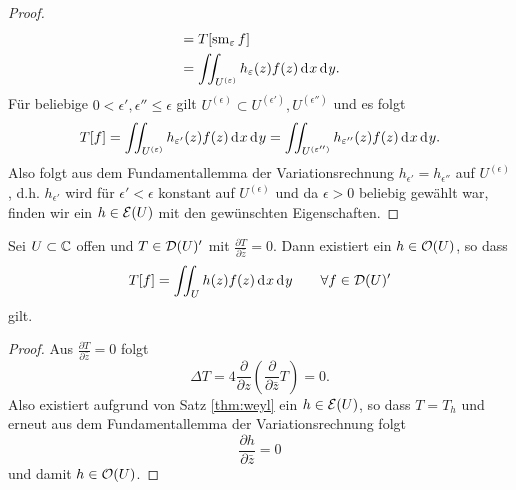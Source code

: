 \begin{proof}
\begin{align*}
    & = T[\sm_\epsilon f] \\
    & = \iint_{U^{(\epsilon)}} h_\epsilon(z) f(z) \d[x]\d[y].
  \end{align*}
  Für beliebige $0 < \epsilon', \epsilon'' \leq \epsilon$ gilt
  $U^{(\epsilon)} \subset U^{(\epsilon')}, U^{(\epsilon'')}$ und es
  folgt
  \[
  T[f] = \iint_{U^{(\epsilon)}}h_{\epsilon'}(z) f(z) \d[x]\d[y] =
  \iint_{U^{(\epsilon'')}}h_{\epsilon''}(z) f(z) \d[x] \d[y].
  \]
  Also folgt aus dem Fundamentallemma der Variationsrechnung
  $h_{\epsilon'} = h_{\epsilon''}$ auf $U^{(\epsilon)}$,
  d.h. $h_{\epsilon'}$ wird für $\epsilon' < \epsilon$ konstant auf
  $U^{(\epsilon)}$ und da $\epsilon > 0$ beliebig gewählt war, finden
  wir ein $h \in \mathcal{E}(U)$ mit den gewünschten Eigenschaften.
\end{proof}

\begin{cor}
  \label{cor:hol-dist}
  Sei $U \subset \mathbb{C}$ offen und $T \in \mathcal{D}(U)'$ mit $\frac{\partial
    T}{\partial \bar z} = 0$. 
  Dann existiert ein $h \in \mathcal{O}(U)$, so dass
  \[
  T[f] = \iint_U h(z)f(z) \d[x]\d[y] \qquad \forall f \in \dist(U)'
  \]
  gilt.
\end{cor}

\begin{proof}
  Aus $\frac{\partial T}{\partial \bar z} = 0$ folgt
  \[
  \Delta T  = 4 \frac{\partial}{\partial z} \left (
    \frac{\partial}{\partial \bar z} T \right ) = 0.
  \]
  Also existiert aufgrund von Satz \ref{thm:weyl} ein $h \in
  \mathcal{E}(U)$, so dass $T = T_h$ und erneut aus dem Fundamentallemma der
  Variationsrechnung folgt
  \[
  \frac{\partial h}{\partial \bar z} = 0
  \]
  und damit $h \in \mathcal{O}(U)$.
\end{proof}



